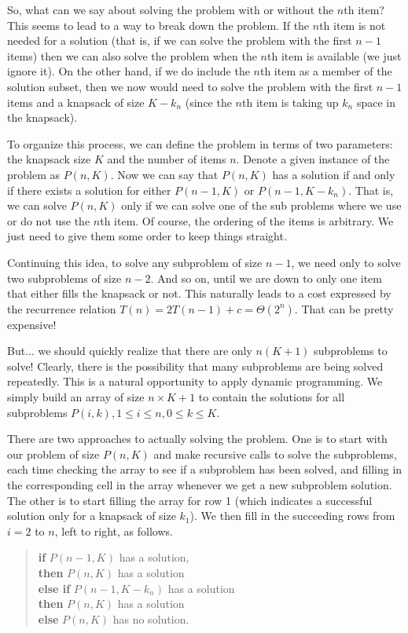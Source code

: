 So, what can we say about solving the problem with or without the
$n$th item?
This seems to lead to a way to break down the problem.
If the $n$th item is not needed for a solution (that is, if we can
solve the problem with the first $n-1$ items) then we can also solve
the problem when the $n$th item is available (we just ignore it).
On the other hand, if we do include the $n$th item as a member of the
solution subset, then we now would need to solve the problem with the
first $n-1$ items and a knapsack of size $K - k_n$ (since the $n$th
item is taking up $k_n$ space in the knapsack).

To organize this process, we can define the problem in terms of
two parameters: the knapsack size $K$ and the number of items $n$.
Denote a given instance of the problem as $P(n, K)$.
Now we can say that $P(n, K)$ has a solution if and only if  there
exists a solution for either $P(n-1, K)$ or $P(n-1, K-k_n)$.
That is, we can solve $P(n, K)$ only if we can solve one of the sub
problems where we use or do not use the $n$th item.
Of course, the ordering of the items is arbitrary.
We just need to give them some order to keep things straight.

Continuing this idea, to solve any subproblem of size $n-1$,
we need only to solve two subproblems of size $n-2$.
And so on, until we are down to only one item that either fills the
knapsack or not.
This naturally leads to a cost expressed by the recurrence relation 
$T(n) = 2T(n-1) + c = \Theta(2^n)$.
That can be pretty expensive!

But... we should quickly realize that there are only $n(K+1)$
subproblems to solve!
Clearly, there is the possibility that many subproblems are being
solved repeatedly.
This is a natural opportunity to apply dynamic programming.
We simply build an array of size $n \times K+1$ to contain the
solutions for all subproblems
$P(i, k), 1 \leq i \leq n, 0 \leq k \leq K$. 

There are two approaches to actually solving the problem.
One is to start with our problem of size $P(n, K)$ and make recursive
calls to solve the subproblems, each time checking the array to see if
a subproblem has been solved, and filling in the corresponding cell in
the array whenever we get a new subproblem solution.
The other is to start filling the array for row 1 (which indicates a
successful solution only for a knapsack of size $k_1$).
We then fill in the succeeding rows
from $i=2$ to $n$, left to right, as follows.

\begin{verse}
\textbf{if} $P(n-1, K)$ has a solution,\\
\quad \textbf{then} $P(n, K)$ has a solution\\
\quad \textbf{else if} $P(n-1, K-k_n)$ has a solution\\
\quad\quad \textbf{then} $P(n, K)$ has a solution\\
\quad\quad \textbf{else} $P(n, K)$ has no solution.
\end{verse}

